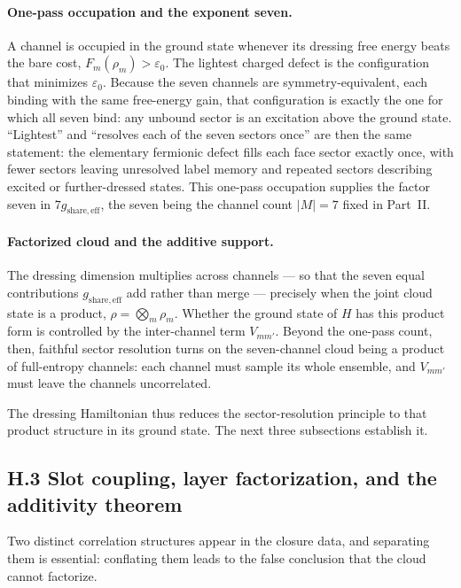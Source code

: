 \documentclass[11pt]{article}
\begin{document}
\paragraph{One-pass occupation and the exponent seven.}
A channel is occupied in the ground state whenever its dressing free energy beats the bare cost, $F_m(\rho_m)>\varepsilon_0$. The lightest charged defect is the configuration that minimizes $\varepsilon_0$. Because the seven channels are symmetry-equivalent, each binding with the same free-energy gain, that configuration is exactly the one for which all seven bind: any unbound sector is an excitation above the ground state. ``Lightest'' and ``resolves each of the seven sectors once'' are then the same statement: the elementary fermionic defect fills each face sector exactly once, with fewer sectors leaving unresolved label memory and repeated sectors describing excited or further-dressed states. This one-pass occupation supplies the factor seven in $7g_{\mathrm{share,eff}}$, the seven being the channel count $|M|=7$ fixed in Part~II.

\paragraph{Factorized cloud and the additive support.}
The dressing dimension multiplies across channels --- so that the seven equal contributions $g_{\mathrm{share,eff}}$ add rather than merge --- precisely when the joint cloud state is a product, $\rho=\bigotimes_m\rho_m$. Whether the ground state of $H$ has this product form is controlled by the inter-channel term $V_{mm'}$. Beyond the one-pass count, then, faithful sector resolution turns on the seven-channel cloud being a product of full-entropy channels: each channel must sample its whole ensemble, and $V_{mm'}$ must leave the channels uncorrelated.

The dressing Hamiltonian thus reduces the sector-resolution principle to that product structure in its ground state. The next three subsections establish it.

\subsection*{H.3 Slot coupling, layer factorization, and the additivity theorem}

Two distinct correlation structures appear in the closure data, and separating them is essential: conflating them leads to the false conclusion that the cloud cannot factorize.
\end{document}
